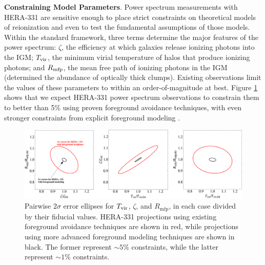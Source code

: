 \documentclass[preprint]{aastex}
\newcommand{\compress}{\vspace{-0.3in}}
\begin{document}

{\bf Constraining Model Parameters}. Power spectrum measurements with HERA-331 are sensitive enough to place strict constraints on theoretical models of
reionization and even to test the fundamental assumptions of those models.  Within the standard framework,
three terms determine the major features of the power spectrum: $\zeta$, the efficiency at which galaxies
release ionizing photons  into the IGM; $T_{\rm vir}$, the minimum virial temperature of halos that produce
ionizing photons; and $R_{\rm mfp}$, the mean free path of ionizing
photons in the IGM (determined the abundance of optically thick clumps).  Existing
observations limit the values of these parameters to within an order-of-magnitude at best.
Figure \ref{fig:ErrorEllipses} shows that we expect
HERA-331 power spectrum observations to constrain them to better
than 5\% using proven foreground avoidance techniques, with even stronger constraints from
explicit foreground modeling \citep{pober_et_al2014}.

\begin{figure}[t]\centering
\includegraphics[width=\textwidth]{plots/Pspec/OPTMIDellipses.pdf}
\caption{\small
Pairwise $2\sigma$ error ellipses for $T_{\rm vir}$, $\zeta$, and $R_\textrm{mfp}$, in each case divided by their fiducial values.  HERA-331 projections using existing foreground avoidance techniques are shown in red, while projections using more advanced foreground modeling techniques are shown in black.  The former represent $\sim 5\%$ constraints, while the latter represent $\sim 1\%$ constraints.\label{fig:ErrorEllipses}}
\end{figure}
\end{document}
